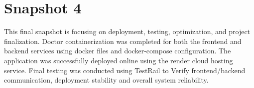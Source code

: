 \documentclass[12pt]{article}
\begin{document}
\section{Snapshot 4}
This final snapshot is focusing on deployment, testing, optimization, and project finalization. Doctor containerization was completed for both the frontend and backend services using docker files and docker-compose configuration.
The application was successfully deployed online using the render cloud hosting service. Final testing was conducted using TestRail to Verify frontend/backend communication, deployment stability and overall system reliability.
\end{document}
